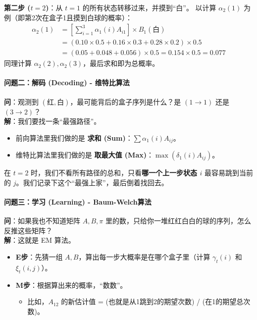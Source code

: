 \documentclass[a4paper, 11pt]{ctexart}
\begin{document}
\textbf{第二步 ($t=2$)}：从 $t=1$ 的所有状态转移过来，并摸到“白”。
以计算 $\alpha_2(1)$ 为例（即第2次在盒子1且摸到白球的概率）：
\begin{equation}
\begin{aligned}
    \alpha_2(1) &= \left[ \sum_{i=1}^3 \alpha_1(i) A_{i1} \right] \times B_{1}(\text{白}) \\
    &= (0.10 \times 0.5 + 0.16 \times 0.3 + 0.28 \times 0.2) \times 0.5 \\
    &= (0.05 + 0.048 + 0.056) \times 0.5 = 0.154 \times 0.5 = 0.077
\end{aligned}
\end{equation}
同理计算 $\alpha_2(2), \alpha_2(3)$，最后求和即为总概率。

\paragraph{问题二：解码 (Decoding) - 维特比算法}
\textbf{问}：观测到 $(\text{红}, \text{白})$，最可能背后的盒子序列是什么？是 $(1 \to 1)$ 还是 $(3 \to 2)$？\\
\textbf{解}：我们要找一条“最强路径”。
\begin{itemize}
    \item 前向算法里我们做的是 \textbf{求和 (Sum)}：$\sum \alpha_1(i) A_{ij}$。
    \item 维特比算法里我们做的是 \textbf{取最大值 (Max)}：$\max (\delta_1(i) A_{ij})$。
\end{itemize}
在 $t=2$ 时，我们不看所有路径的总和，只看\textbf{哪一个上一步状态 $i$} 最容易跳到当前的 $j$。我们记录下这个“最强上家”，最后倒着找回去。

\paragraph{问题三：学习 (Learning) - Baum-Welch算法}
\textbf{问}：如果我也不知道矩阵 $A, B, \pi$ 里的数，只给你一堆红红白白的球的序列，怎么反推这些矩阵？\\
\textbf{解}：这就是 EM 算法。
\begin{itemize}
    \item \textbf{E步}：先猜一组 $A, B$，算出每一步大概率是在哪个盒子里（计算 $\gamma_t(i)$ 和 $\xi_t(i,j)$）。
    \item \textbf{M步}：根据算出来的概率，“数数”。
    \begin{itemize}
        \item 比如，$A_{12}$ 的新估计值 = (也就是从1跳到2的期望次数) / (在1的期望总次数)。
    \end{itemize}
\end{itemize}
\end{document}
